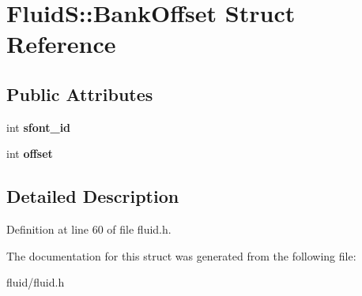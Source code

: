\hypertarget{struct_fluid_s_1_1_bank_offset}{}\section{FluidS\+:\+:Bank\+Offset Struct Reference}
\label{struct_fluid_s_1_1_bank_offset}
\subsection*{Public Attributes}
\begin{DoxyCompactItemize}
\item 
\mbox{\label{struct_fluid_s_1_1_bank_offset_a72d5cf5fff2e733df2b6b41b1efb0993}} 
int {\bfseries sfont\+\_\+id}
\item 
\mbox{\label{struct_fluid_s_1_1_bank_offset_a02d5113739d175843d659d3009ef229b}} 
int {\bfseries offset}
\end{DoxyCompactItemize}


\subsection{Detailed Description}


Definition at line 60 of file fluid.\+h.



The documentation for this struct was generated from the following file\+:\begin{DoxyCompactItemize}
\item 
fluid/fluid.\+h\end{DoxyCompactItemize}

